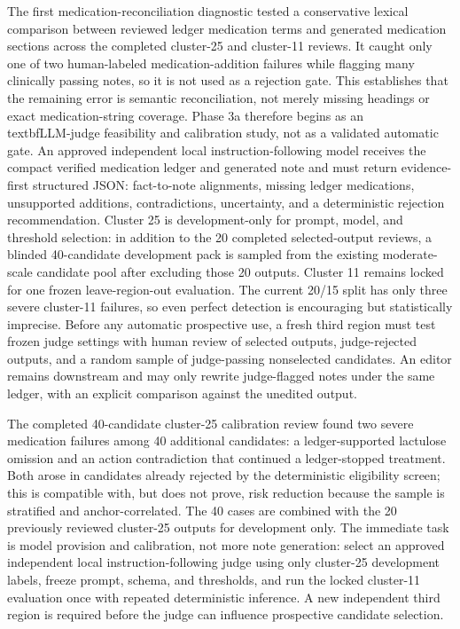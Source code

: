 \documentclass[11pt]{article}
\begin{document}
The first medication-reconciliation diagnostic tested a conservative lexical comparison between reviewed ledger medication terms and generated medication sections across the completed cluster-25 and cluster-11 reviews. It caught only one of two human-labeled medication-addition failures while flagging many clinically passing notes, so it is not used as a rejection gate. This establishes that the remaining error is semantic reconciliation, not merely missing headings or exact medication-string coverage. Phase 3a therefore begins as an \\textbf{LLM-judge feasibility and calibration study}, not as a validated automatic gate. An approved independent local instruction-following model receives the compact verified medication ledger and generated note and must return evidence-first structured JSON: fact-to-note alignments, missing ledger medications, unsupported additions, contradictions, uncertainty, and a deterministic rejection recommendation. Cluster 25 is development-only for prompt, model, and threshold selection: in addition to the 20 completed selected-output reviews, a blinded 40-candidate development pack is sampled from the existing moderate-scale candidate pool after excluding those 20 outputs. Cluster 11 remains locked for one frozen leave-region-out evaluation. The current 20/15 split has only three severe cluster-11 failures, so even perfect detection is encouraging but statistically imprecise. Before any automatic prospective use, a fresh third region must test frozen judge settings with human review of selected outputs, judge-rejected outputs, and a random sample of judge-passing nonselected candidates. An editor remains downstream and may only rewrite judge-flagged notes under the same ledger, with an explicit comparison against the unedited output.

The completed 40-candidate cluster-25 calibration review found two severe medication failures among 40 additional candidates: a ledger-supported lactulose omission and an action contradiction that continued a ledger-stopped treatment. Both arose in candidates already rejected by the deterministic eligibility screen; this is compatible with, but does not prove, risk reduction because the sample is stratified and anchor-correlated. The 40 cases are combined with the 20 previously reviewed cluster-25 outputs for development only. The immediate task is model provision and calibration, not more note generation: select an approved independent local instruction-following judge using only cluster-25 development labels, freeze prompt, schema, and thresholds, and run the locked cluster-11 evaluation once with repeated deterministic inference. A new independent third region is required before the judge can influence prospective candidate selection.
\end{document}
